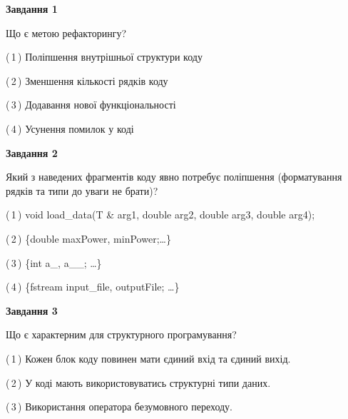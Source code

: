 \documentclass[10pt, ukrainian]{article}
\begin{document}
{
\begin {large}
{\begin {center}\textbf{Завдання 1}\end {center}}\par
Що є метою рефакторингу?\par
\vspace{2mm}



(\,1\,) Поліпшення внутрішньої структури коду%



(\,2\,) Зменшення кількості рядків коду%



(\,3\,) Додавання нової функціональності%



(\,4\,) Усунення помилок у коді%


{\begin {center}\textbf{Завдання 2}\end {center}}\par
Який з наведених фрагментів коду явно потребує поліпшення (форматування рядків та типи до уваги не брати)?\par
\vspace{2mm}



(\,1\,) void load\_data(T \& arg1, double arg2, double arg3, double arg4); %



(\,2\,) \{double maxPower, minPower;…\} %



(\,3\,) \{int a\_, a\_\_; …\}%



(\,4\,) \{fstream input\_file, outputFile; …\}%


{\begin {center}\textbf{Завдання 3}\end {center}}\par
Що є характерним для структурного програмування?\par
\vspace{2mm}



(\,1\,) Кожен блок коду повинен мати єдиний вхід та єдиний вихід.%



(\,2\,) У коді мають використовуватись структурні типи даних. %



(\,3\,) Використання оператора безумовного переходу. %




\end{large}}
\end{document}
